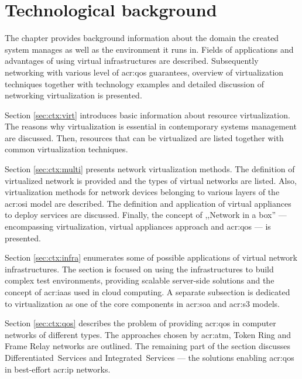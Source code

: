 \documentclass[11pt]{book}
\begin{document}
  \chapter{Technological background}
  \label{chap:bck}

    The chapter provides background information about the domain the created system manages as well as the environment
    it runs in. Fields of applications and advantages of using virtual infrastructures are described. Subsequently
    networking with various level of \gls{acr:qos} guarantees, overview of virtualization techniques together with
    technology examples and detailed discussion of networking virtualization is presented.

    Section \ref{sec:ctx:virt} introduces basic information about resource virtualization. The reasons why
    virtualization is essential in contemporary systems management are discussed. Then, resources that can be
    virtualized are listed together with common virtualization techniques.

    Section \ref{sec:ctx:multi} presents network virtualization methods. The definition of virtualized network is
    provided and the types of virtual networks are listed. Also, virtualization methods for network devices belonging to
    various layers of the \gls{acr:osi} model are described. The definition and application of virtual appliances to
    deploy services are discussed. Finally, the concept of ,,Network in a box'' --- encompassing virtualization, virtual
    appliances approach and \gls{acr:qos} --- is presented.

    Section \ref{sec:ctx:infra} enumerates some of possible applications of virtual network infrastructures. The section
    is focused on using the infrastructures to build complex test environments, providing scalable server-side solutions
    and the concept of \gls{acr:iaas} used in cloud computing. A separate subsection is dedicated to virtualization as
    one of the core components in \gls{acr:soa} and \gls{acr:s3} models.

    Section \ref{sec:ctx:qos} describes the problem of providing \gls{acr:qos} in computer networks of different types.
    The approaches chosen by \gls{acr:atm}, Token Ring and Frame Relay networks are outlined. The remaining part of the
    section discusses Differentiated~Services and Integrated~Services --- the solutions enabling \gls{acr:qos} in
    best-effort \gls{acr:ip} networks.

\end{document}
